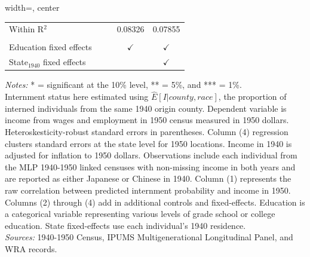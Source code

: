 \begin{table}[htbp]
\begin{adjustbox}{width=\textwidth, center}
\begin{tabular}{lcccc}
      Within R$^2$                 &         &                 & 0.08326         & 0.07855\\  
       \\
      Education fixed effects      &         &                 & $\checkmark$    & $\checkmark$\\   
      State$_{1940}$ fixed effects &         &                 &                 & $\checkmark$\\   
      \bottomrule
   \end{tabular}
   \end{adjustbox}
   {\footnotesize
   \emph{Notes:}
   * = significant at the 10\% level,
   ** = 5\%, and
   *** = 1\%. \\
   Internment status here estimated using $\hat{E}[I|county, race]$,
   the proportion of interned individuals from the same 1940 origin county.
   Dependent variable is income from wages and employment in 1950 census
   measured in 1950 dollars.
   Heteroskesticity-robust standard errors in parentheses.
   Column (4) regression clusters standard errors at the state level for 1950 locations.
   Income in 1940 is adjusted for inflation to 1950 dollars.
   Observations include each individual from the MLP 1940-1950 linked censuses
   with non-missing income in both years
   and are reported as either Japanese or Chinese in 1940.
   Column (1) represents the raw correlation between predicted internment probability
   and income in 1950.
   Columns (2) through (4) add in additional controls and fixed-effects.
   Education is a categorical variable representing various levels
   of grade school or college education.
   State fixed-effects use each individual's 1940 residence. \\
   \emph{Sources:} 1940-1950 Census, IPUMS Multigenerational Longitudinal Panel,
   and WRA records.
   }
\end{table}